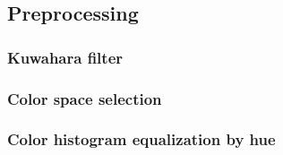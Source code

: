 \subsection{Preprocessing}
\subsubsection{Kuwahara filter}
\subsubsection{Color space selection}
\subsubsection{Color histogram equalization by hue}
